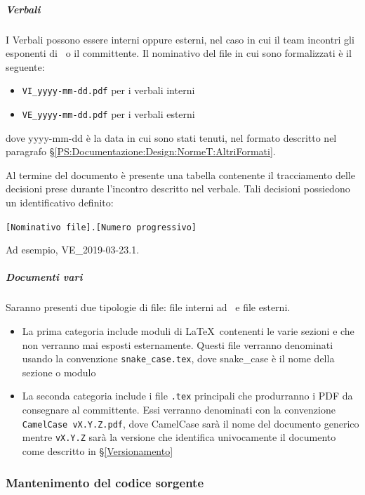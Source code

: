 			\subparagraph{Verbali}	\label{NomenclaturaVerbali}
			I Verbali  possono essere interni oppure esterni, nel caso in cui il team incontri gli esponenti di \II\ o il committente.
			Il nominativo del file in cui sono formalizzati è il seguente:
			\begin{itemize}
				\item \texttt{VI\_yyyy-mm-dd.pdf} per i verbali interni
				\item \texttt{VE\_yyyy-mm-dd.pdf} per i verbali esterni
			\end{itemize}
			dove yyyy-mm-dd è la data in cui sono stati tenuti, nel formato descritto nel paragrafo \S\ref{PS:Documentazione:Design:NormeT:AltriFormati}. \par
            Al termine del documento è presente una tabella contenente il tracciamento delle decisioni prese durante l'incontro descritto nel verbale. Tali decisioni possiedono un identificativo definito:
            \begin{center}
                \texttt{[Nominativo file].[Numero progressivo]}
            \end{center}
            Ad esempio, VE\_2019-03-23.1.

			\subparagraph{Documenti vari}
			Saranno presenti due tipologie di file: file interni ad \gruppo\ e file esterni.
			\begin{itemize}
				\item La prima categoria include moduli di \LaTeX\ contenenti le varie sezioni e che non verranno mai esposti esternamente. Questi file verranno
					denominati usando la convenzione \texttt{snake\_case.tex}, dove snake\_case è il nome della sezione o modulo
				\item La seconda categoria include i file \texttt{.tex} principali che produrranno i PDF da consegnare al committente. Essi verranno denominati
				con la convenzione \mbox{\texttt{CamelCase vX.Y.Z.pdf}}, dove CamelCase sarà il nome del documento generico mentre \texttt{vX.Y.Z}
				sarà la versione che identifica univocamente il documento come descritto in \S\ref{Versionamento}
			\end{itemize}



		\subsubsection{Mantenimento del codice sorgente}\label{MantenimentoCodice}

